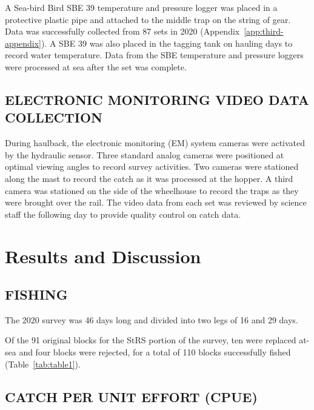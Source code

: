 \documentclass[12pt]{article}\usepackage[]{graphicx}\usepackage[]{color}
\begin{document}
A Sea-bird Bird SBE 39 temperature and pressure logger was placed in a protective plastic pipe and attached to the middle trap on the string of gear. Data was successfully collected from 87 sets in 2020 (Appendix~\ref{app:third-appendix}). A SBE 39 was also placed in the tagging tank on hauling days to record water temperature. Data from the SBE temperature and pressure loggers were processed at sea after the set was complete.

\hypertarget{electronic-monitoring-video-data-collection}{%
\subsection{ELECTRONIC MONITORING VIDEO DATA COLLECTION}\label{electronic-monitoring-video-data-collection}}

During haulback, the electronic monitoring (EM) system cameras were activated by the hydraulic sensor. Three standard analog cameras were positioned at optimal viewing angles to record survey activities. Two cameras were stationed along the mast to record the catch as it was processed at the hopper. A third camera was stationed on the side of the wheelhouse to record the traps as they were brought over the rail. The video data from each set was reviewed by science staff the following day to provide quality control on catch data.

\clearpage

\hypertarget{results-and-discussion}{%
\section{Results and Discussion}\label{results-and-discussion}}

\hypertarget{fishing}{%
\subsection{FISHING}\label{fishing}}

The 2020 survey was 46 days long and divided into two legs of 16 and 29 days.

Of the 91 original blocks for the StRS portion of the survey, ten were replaced at-sea and four blocks were rejected, for a total of 110 blocks successfully fished (Table~\ref{tab:table1}).

\hypertarget{catch-per-unit-effort-cpue}{%
\subsection{CATCH PER UNIT EFFORT (CPUE)}\label{catch-per-unit-effort-cpue}}
\end{document}
